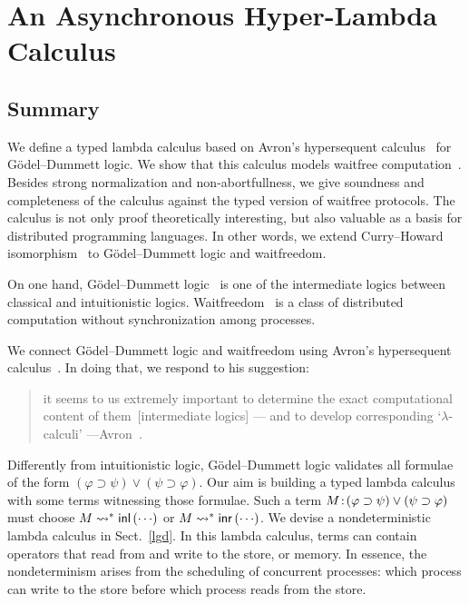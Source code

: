 \renewcommand{\comodL}{\comod cd}
\renewcommand{\comodR}{\comod dc}

\chapter{An Asynchronous Hyper-Lambda Calculus}
\label{ch:lambda}

\section{Summary}

We define a typed lambda calculus based on Avron's hypersequent
calculus~\citep{avron91} for G\"odel--Dummett logic.
We show that this calculus models
waitfree computation~\citep{Herlihy88,Saks:1993vq}.
Besides strong normalization and non-abortfullness,
we give soundness and completeness of
the calculus against the typed version of waitfree protocols.
The calculus is not only proof theoretically interesting,
but also valuable as a basis for distributed programming languages.
In other words, we extend
Curry--Howard isomorphism~\cite{curryhoward} to G\"odel--Dummett logic and
waitfreedom.

On one hand, G\"odel--Dummett logic~\cite{dummett59}
is one of the intermediate logics
between classical and intuitionistic logics.
Waitfreedom~\cite{Herlihy88,Saks:1993vq} is a class of distributed
computation without synchronization among processes.

We connect G\"odel--Dummett logic and waitfreedom using
Avron's hypersequent calculus~\cite{avron91}.
In doing that, we respond to his suggestion:
\begin{quote}
it seems to us extremely important to determine the exact
       computational content of them~[intermediate logics] ---
       and {to develop corresponding `$\lambda$-calculi'}
       ---Avron~\cite{avron91}.
\end{quote}
Differently from intuitionistic logic, G\"odel--Dummett logic validates
all formulae of the form
 $(\varphi\supset\psi)\vee(\psi\supset\varphi)$.
Our aim is building a typed lambda calculus
with some terms witnessing those formulae.
Such a term
${M} \mathord{\colon\kern -2pt}{(\varphi\supset\psi)\vee(\psi\supset\varphi)}$ must choose
$M\rightsquigarrow^\ast \mathsf{inl}\left({\cdots}\right)$ or $M\rightsquigarrow^\ast \mathsf{inr}\left({\cdots}\right)$.
We devise a nondeterministic lambda calculus in Sect.~\ref{lgd}.
In this lambda calculus, terms can contain operators that read from and
write to the store, or memory.
In essence, the nondeterminism arises from the scheduling of concurrent
processes: which process can write to the store before which process
reads from the store.

